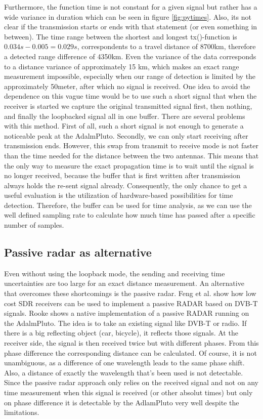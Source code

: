 \documentclass[journal]{IEEEtran}
\begin{document}
Furthermore, the function time is not constant for a given signal but rather has a wide variance in duration which can be seen in figure \ref{fig:pytimes}.
Also, its not clear if the transmission starts or ends with that statement (or even something in between).
The time range between the shortest and longest tx()-function is $0.034s-0.005=0.029s$,  correspondents to a travel distance of 8700km,  therefore a detected range difference of 4350km. Even the variance of the data corresponds to a distance variance of approximately 15 km, which makes an exact range measurement impossible, especially when our range of detection is limited by the approximately 50meter, after which no signal is received.
One idea to avoid the dependence on this vague time would be to use such a short signal that when the receiver is started we capture the original transmitted signal first, then nothing, and finally the loopbacked  signal all in one buffer.
There are several problems with this method.
First of all, such a short signal is not enough to generate a noticeable peak at the AdalmPluto.
Secondly, we can only start receiving after transmission ends.
However, this swap from transmit to receive mode is not faster than the time needed for the distance between the two antennas. 
This means that the only way to measure the exact propagation time is to wait until the signal is no longer received, because the buffer that is first written after transmission always holds the re-sent signal already.
Consequently, the only chance to get a useful evaluation is the utilization of hardware-based possibilities for time detection.
Therefore, the buffer can be used for time analysis, as we can use the well defined sampling rate to calculate how much time has passed after a specific number of samples.

\subsection{Passive radar as alternative}
\label{sec:Alternatives}
Even without using the loopback mode, the sending and receiving time uncertainties are too large for an exact distance measurement.
An alternative that overcomes these shortcomings is the passive radar.
Feng et al. \cite{sdrpassive} show how low cost SDR receivers can be used to implement a passive RADAR based on DVB-T signals.
Rooke \cite{plutopassive} shows a native implementation of a passive RADAR running on the AdalmPluto.
The idea is to take an existing signal like DVB-T or radio.
If there is a big reflecting object (car, bicycle), it reflects those signals.
At the receiver side, the signal is then received twice but with different phases.
From this phase difference the corresponding distance can be calculated.
Of course, it is not unambiguous, as a difference of one wavelength leads to the same phase shift.
Also, a distance of exactly the wavelength that's been used is not detectable.
Since the passive radar approach only relies on the received signal and not on any time measurement when this signal is received (or other absolut times) but only on phase difference it is detectable by the AdlamPluto very well despite the limitations.
\end{document}
